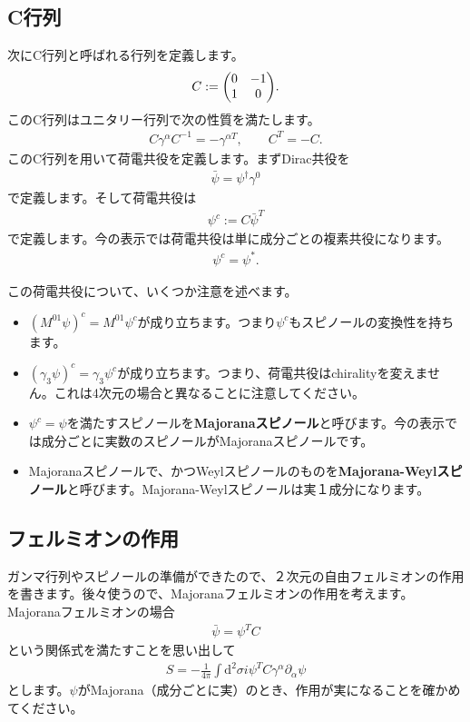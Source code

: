 \documentclass[report,paper=a4, fontsize=12pt, line_length=16cm, number_of_lines=34,dvipdfmx]{jlreq}
\numberwithin{equation}{chapter}
\numberwithin{equation}{section}
\newcommand{\del}{\partial}
\newcommand{\kyou}[1]{{\sffamily \bfseries #1}}
\newcommand{\di}{\mathrm{d}}
\begin{document}
\subsection{C行列}
次にC行列と呼ばれる行列を定義します。
\begin{align}
  C:=\mqty(0 & -1 \\ 1 & 0).
\end{align}
このC行列はユニタリー行列で次の性質を満たします。
\begin{align}
  C\gamma^{\alpha}C^{-1}=-\gamma^{\alpha T},\qquad C^T=-C.
\end{align}
このC行列を用いて荷電共役を定義します。まずDirac共役を
\begin{align}
  \bar{\psi}=\psi^{\dag}\gamma^0
\end{align}
で定義します。そして荷電共役は
\begin{align}
  \psi^{c}:=C\bar{\psi}^{T}
\end{align}
で定義します。今の表示では荷電共役は単に成分ごとの複素共役になります。
\begin{align}
  \psi^{c}=\psi^{*}.
\end{align}

この荷電共役について、いくつか注意を述べます。
\begin{itemize}
  \item $(M^{01}\psi)^c=M^{01}\psi^c$が成り立ちます。つまり$\psi^{c}$もスピノールの変換性を持ちます。
  \item $(\gamma_3 \psi)^{c}=\gamma_3 \psi^c$が成り立ちます。つまり、荷電共役はchiralityを変えません。これは4次元の場合と異なることに注意してください。
  \item $\psi^{c}=\psi$を満たすスピノールを\kyou{Majoranaスピノール}と呼びます。今の表示では成分ごとに実数のスピノールがMajoranaスピノールです。
  \item Majoranaスピノールで、かつWeylスピノールのものを\kyou{Majorana-Weylスピノール}と呼びます。Majorana-Weylスピノールは実１成分になります。
\end{itemize}

\subsection{フェルミオンの作用}
ガンマ行列やスピノールの準備ができたので、２次元の自由フェルミオンの作用を書きます。後々使うので、Majoranaフェルミオンの作用を考えます。Majoranaフェルミオンの場合
\begin{align}
  \bar{\psi}=\psi^{T}C
\end{align}
という関係式を満たすことを思い出して
\begin{align}
  S=-\frac{1}{4\pi}\int \di^2 \sigma i\psi^{T}C\gamma^{\alpha}\del_{\alpha}\psi\label{fermionaction0}
\end{align}
とします。$\psi$がMajorana（成分ごとに実）のとき、作用が実になることを確かめてください。
\end{document}
